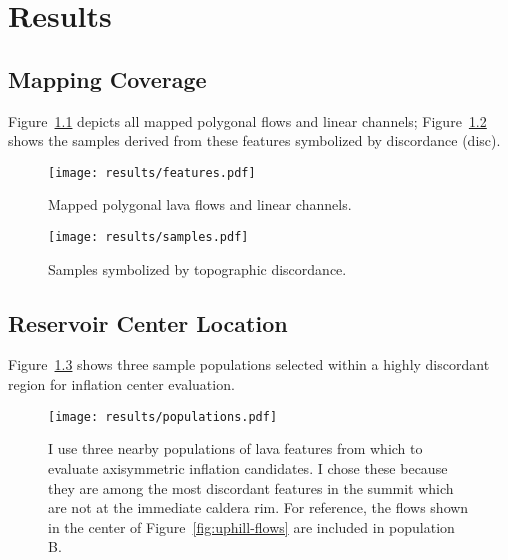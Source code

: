 \chapter{Results}\label{cha:results}

\section{Mapping Coverage}

Figure~\ref{fig:features} depicts all mapped polygonal flows and linear channels; Figure~\ref{fig:samples} shows the samples derived from these features symbolized by discordance (\acs{disc}).

\begin{figure}
    \texttt{[image: results/features.pdf]}%
    \caption[Mapped lava features]{Mapped polygonal lava flows and linear channels.}%
    \label{fig:features}
\end{figure}

\begin{figure}
    \texttt{[image: results/samples.pdf]}%
    \caption[Mapped topographic discordance]{Samples symbolized by topographic discordance.}%
    \label{fig:samples}
\end{figure}

\section{Reservoir Center Location}

Figure~\ref{fig:populations} shows three sample populations selected within a highly discordant region for inflation center evaluation.

\begin{figure}
    \texttt{[image: results/populations.pdf]}%
    \caption[Sample populations for inflation center evaluation]{I use three nearby populations of lava features from which to evaluate axisymmetric inflation candidates. I chose these because they are among the most discordant features in the summit which are not at the immediate caldera rim. For reference, the flows shown in the center of Figure~\ref{fig:uphill-flows} are included in population B.}%
    \label{fig:populations}
\end{figure}

